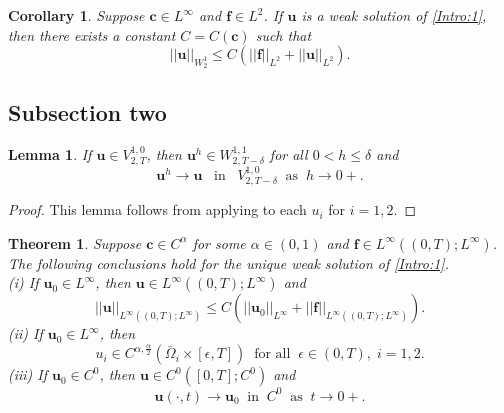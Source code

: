 \documentclass[twoside,10pt]{article}
\newtheorem{lemma}{\bf Lemma}[section]
\newtheorem{theorem}{\bf Theorem}[section]
\newtheorem{corollary}{\bf Corollary}[section]
\numberwithin{equation}{section}
\newcommand{\bsu}{{\boldsymbol{u}}}
\newcommand{\bsf}{\boldsymbol{f}}
\newcommand{\bsc}{\boldsymbol{c}}
\begin{document}
\begin{corollary}
	Suppose $\bsc\in L^\infty$ and $\bsf\in L^2$. If $\bsu$ is a weak solution of \eqref{Intro:1}, then there exists a constant $C=C(\bsc)$ such that
	\begin{equation}
		||\bsu||_{W_2^1}\le C \left(||\bsf||_{L^2} + ||\bsu||_{L^2}\right).
	\end{equation}
\end{corollary}

\subsection{Subsection two}\label{subsec:2}














\begin{lemma}\label{lem:steklov}
	If $\bsu\in V_{2,T}^{1,0}$, then $\bsu^h\in W^{1,1}_{2,T-\delta}$ for all $0<h\le \delta$ and
	\begin{equation}
		\bsu^h\to \bsu \;\;\; \mbox{in}\;\;\; V_{2,T-\delta}^{1,0}\;\;\mbox{as}\;\; h\to 0+.
	\end{equation}
\end{lemma}
\begin{proof}
This lemma follows from applying \cite[p.\,85, Lemma\,4.7]{LSU1968} to each $u_i$ for $i=1,2$.
\end{proof}




	
	
	





\begin{theorem}\label{weaksol:1}
	Suppose $\bsc\in C^{\alpha}$ for some $\alpha\in(0,1)$ and $\bsf\in L^\infty((0,T); L^\infty)$. The following conclusions hold for the unique weak solution of \eqref{Intro:1}.\\
\noindent\emph{(i)} If $\bsu_0\in L^\infty$, then $\bsu\in L^\infty((0,T);L^\infty)$ and
\begin{equation}\label{eq:bound}
			||\bsu||_{L^\infty((0,T);L^\infty)}\le C \left( ||\bsu_0||_{L^\infty} + ||\bsf||_{L^\infty((0,T);L^\infty)}\right).
		\end{equation}
\noindent\emph{(ii)} If $\bsu_0\in L^\infty$, then
	   \begin{equation}\label{eq:holder}
	   	u_i\in C^{\alpha,\frac{\alpha}{2}}(\bar{\Omega}_i\times [\epsilon,T])\;\;\mbox{for all} \; \; \epsilon\in (0,T), \;i=1,2.
	   \end{equation}
\noindent\emph{(iii)} If $\bsu_0\in C^0$, then $\bsu\in C^0([0,T];C^0)$ and
	   \begin{equation}
	   	\bsu(\cdot,t)\to \bsu_0\;\;\mbox{in}\;\; C^0\;\;\mbox{as}\;\; t\to 0+.
	   \end{equation}
\end{theorem}
\end{document}
